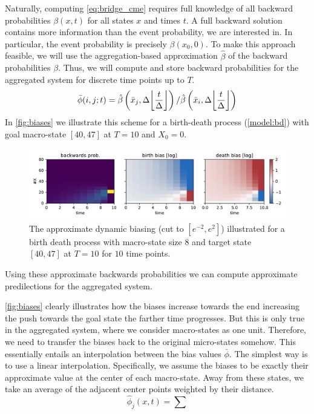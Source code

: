 Naturally, computing \eqref{eq:bridge_cme} requires full knowledge of all backward probabilities $\beta(x, t)$ for all states $x$ and times $t$.
A full backward solution contains more information than the event probability, we are interested in.
In particular, the event probability is precisely $\beta(x_0, 0)$.
To make this approach feasible, we will use the aggregation-based approximation $\hat{\beta}$ of the backward probabilities $\beta$.
Thus, we will compute and store backward probabilities for the aggregated system for discrete time points up to $T$.
\[
    \bar{\phi}(i, j; t) = \hat{\beta}\left(\bar{x}_j, \Delta\floor*{\frac{t}{\Delta}}\right) / \hat{\beta}\left(\bar{x}_i, \Delta\floor*{\frac{t}{\Delta}}\right)
\]
In \autoref{fig:biases} we illustrate this scheme for a birth-death process (\autoref{model:bd}) with goal macro-state $[40,47]$ at $T=10$
and $X_0=0$.
\begin{figure}
    \centering
    \includegraphics[width=\textwidth]{gfx/biases.pdf}
    \caption[Approximate biasing]{\label{fig:biases}The approximate dynamic biasing (cut to $[e^{-2}, e^{2}]$) illustrated for a birth death process with macro-state size $8$ and target state $[40, 47]$ at $T=10$ for $10$ time points.}
\end{figure}

Using these approximate backwards probabilities we can compute approximate predilections for the aggregated system.

\autoref{fig:biases} clearly illustrates how the biases increase towards the end increasing the push towards the goal state the farther time progresses.
But this is only true in the aggregated system, where we consider macro-states as one unit.
Therefore, we need to transfer the biases back to the original micro-states somehow.
This essentially entails an interpolation between the bias values $\bar{\phi}$.
The simplest way is to use a linear interpolation.
Specifically, we assume the biases to be exactly their approximate value at the center of each macro-state.
Away from these states, we take an average of the adjacent center points weighted by their distance.
\[
    \hat{\phi}_j(x, t) = \sum
\]

